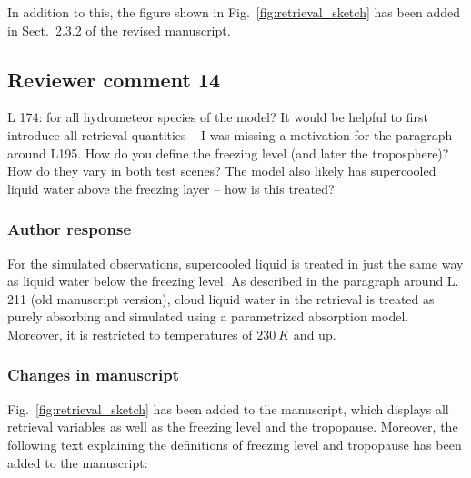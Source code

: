 In addition to this, the figure shown in Fig.~\ref{fig:retrieval_sketch} has been added
in Sect.~2.3.2 of the revised manuscript.


%

\subsection*{Reviewer comment 14}

L 174: for all hydrometeor species of the model? It would be helpful to first
introduce all retrieval quantities – I was missing a motivation for the
paragraph around L195. How do you define the freezing level (and later the
troposphere)? How do they vary in both test scenes? The model also likely has
supercooled liquid water above the freezing layer – how is this treated?

\subsubsection*{Author response}

For the simulated observations, supercooled liquid is treated in just the same
way as liquid water below the freezing level. As described in the paragraph
around L. 211 (old manuscript version), cloud liquid water in the retrieval is
treated as purely absorbing and simulated using a parametrized absorption model.
Moreover, it is restricted to temperatures of $230\ \unit{K}$ and up.

\subsubsection*{Changes in manuscript}

Fig.~\ref{fig:retrieval_sketch} has been added to the manuscript, which
displays all retrieval variables as well as the freezing level and the tropopause.
Moreover, the following text explaining the definitions of freezing level and
tropopause has been added to the manuscript:

